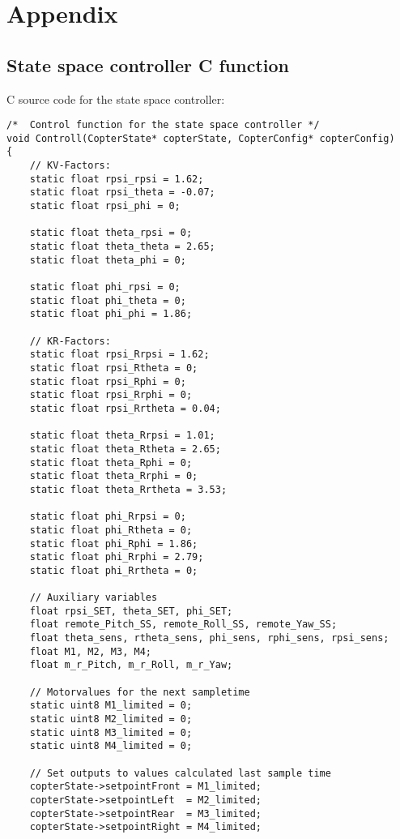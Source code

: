 \section{Appendix}\label{chapter_Appendix}

\subsection{State space controller C function}\label{chapter_CFUNC}
C source code for the state space controller:

\lstset{language=C}
\begin{lstlisting}
/*  Control function for the state space controller */
void Controll(CopterState* copterState, CopterConfig* copterConfig) 
{
    // KV-Factors:
    static float rpsi_rpsi = 1.62;
    static float rpsi_theta = -0.07;
    static float rpsi_phi = 0;

    static float theta_rpsi = 0;
    static float theta_theta = 2.65;
    static float theta_phi = 0;

    static float phi_rpsi = 0;
    static float phi_theta = 0;
    static float phi_phi = 1.86;

    // KR-Factors:
    static float rpsi_Rrpsi = 1.62;
    static float rpsi_Rtheta = 0;
    static float rpsi_Rphi = 0;
    static float rpsi_Rrphi = 0;
    static float rpsi_Rrtheta = 0.04;

    static float theta_Rrpsi = 1.01;
    static float theta_Rtheta = 2.65;
    static float theta_Rphi = 0;
    static float theta_Rrphi = 0;
    static float theta_Rrtheta = 3.53;

    static float phi_Rrpsi = 0;
    static float phi_Rtheta = 0;
    static float phi_Rphi = 1.86;
    static float phi_Rrphi = 2.79;
    static float phi_Rrtheta = 0;

    // Auxiliary variables
    float rpsi_SET, theta_SET, phi_SET; 
    float remote_Pitch_SS, remote_Roll_SS, remote_Yaw_SS;
    float theta_sens, rtheta_sens, phi_sens, rphi_sens, rpsi_sens;
    float M1, M2, M3, M4;
    float m_r_Pitch, m_r_Roll, m_r_Yaw;    
     
    // Motorvalues for the next sampletime
    static uint8 M1_limited = 0;
    static uint8 M2_limited = 0;
    static uint8 M3_limited = 0;
    static uint8 M4_limited = 0;

    // Set outputs to values calculated last sample time
    copterState->setpointFront = M1_limited;
    copterState->setpointLeft  = M2_limited;
    copterState->setpointRear  = M3_limited;
    copterState->setpointRight = M4_limited;


\end{lstlisting}
